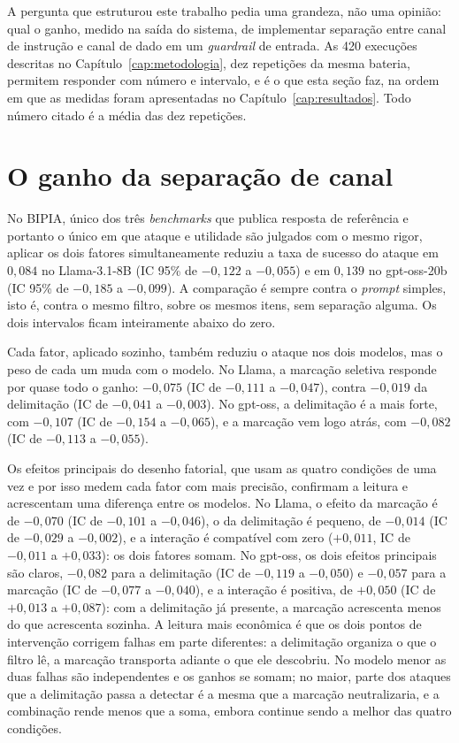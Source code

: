 \label{sec:conclusao}

A pergunta que estruturou este trabalho pedia uma grandeza, não uma opinião:
qual o ganho, medido na saída do sistema, de implementar separação entre canal
de instrução e canal de dado em um \textit{guardrail} de entrada. As 420
execuções descritas no Capítulo~\ref{cap:metodologia}, dez repetições da
mesma bateria, permitem responder com número e intervalo, e é o que esta
seção faz, na ordem em que as medidas foram apresentadas no
Capítulo~\ref{cap:resultados}. Todo número citado é a média das dez
repetições.

\section{O ganho da separação de canal}\label{sec:conc_ganho}

No BIPIA, único dos três \textit{benchmarks} que publica resposta de referência
e portanto o único em que ataque e utilidade são julgados com o mesmo rigor,
aplicar os dois fatores simultaneamente reduziu a taxa de sucesso do ataque em
$0{,}084$ no Llama-3.1-8B (IC 95\% de $-0{,}122$ a $-0{,}055$) e em $0{,}139$
no gpt-oss-20b (IC 95\% de $-0{,}185$ a $-0{,}099$). A comparação é sempre
contra o \textit{prompt} simples, isto é, contra o mesmo filtro, sobre os mesmos
itens, sem separação alguma. Os dois intervalos ficam inteiramente abaixo do
zero.

Cada fator, aplicado sozinho, também reduziu o ataque nos dois modelos, mas o
peso de cada um muda com o modelo. No Llama, a marcação seletiva responde por
quase todo o ganho: $-0{,}075$ (IC de $-0{,}111$ a $-0{,}047$), contra
$-0{,}019$ da delimitação (IC de $-0{,}041$ a $-0{,}003$). No gpt-oss, a
delimitação é a mais forte, com $-0{,}107$ (IC de $-0{,}154$ a $-0{,}065$),
e a marcação vem logo atrás, com $-0{,}082$ (IC de $-0{,}113$ a $-0{,}055$).

Os efeitos principais do desenho fatorial, que usam as quatro condições de uma
vez e por isso medem cada fator com mais precisão, confirmam a leitura e
acrescentam uma diferença entre os modelos. No Llama, o efeito da marcação é
de $-0{,}070$ (IC de $-0{,}101$ a $-0{,}046$), o da delimitação é pequeno, de
$-0{,}014$ (IC de $-0{,}029$ a $-0{,}002$), e a interação é compatível com
zero ($+0{,}011$, IC de $-0{,}011$ a $+0{,}033$): os dois fatores somam. No
gpt-oss, os dois efeitos principais são claros, $-0{,}082$ para a delimitação
(IC de $-0{,}119$ a $-0{,}050$) e $-0{,}057$ para a marcação (IC de
$-0{,}077$ a $-0{,}040$), e a interação é positiva, de $+0{,}050$ (IC de
$+0{,}013$ a $+0{,}087$): com a delimitação já presente, a marcação acrescenta
menos do que acrescenta sozinha. A leitura mais econômica é que os dois pontos
de intervenção corrigem falhas em parte diferentes: a delimitação organiza o
que o filtro lê, a marcação transporta adiante o que ele descobriu. No modelo
menor as duas falhas são independentes e os ganhos se somam; no maior, parte
dos ataques que a delimitação passa a detectar é a mesma que a marcação
neutralizaria, e a combinação rende menos que a soma, embora continue sendo a
melhor das quatro condições.

